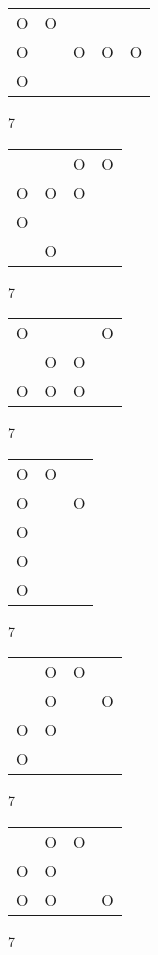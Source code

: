 \begin{tabular}{|m{0.2cm}m{0.2cm}m{0.2cm}m{0.2cm}m{0.2cm}|}\hline
O&O& & & \\
O& &O&O&O\\
O& & & & \\
\hline\end{tabular}7
\begin{tabular}{|m{0.2cm}m{0.2cm}m{0.2cm}m{0.2cm}|}\hline
 & &O&O\\
O&O&O& \\
O& & & \\
 &O& & \\
\hline\end{tabular}7
\begin{tabular}{|m{0.2cm}m{0.2cm}m{0.2cm}m{0.2cm}|}\hline
O& & &O\\
 &O&O& \\
O&O&O& \\
\hline\end{tabular}7
\begin{tabular}{|m{0.2cm}m{0.2cm}m{0.2cm}|}\hline
O&O& \\
O& &O\\
O& & \\
O& & \\
O& & \\
\hline\end{tabular}7
\begin{tabular}{|m{0.2cm}m{0.2cm}m{0.2cm}m{0.2cm}|}\hline
 &O&O& \\
 &O& &O\\
O&O& & \\
O& & & \\
\hline\end{tabular}7
\begin{tabular}{|m{0.2cm}m{0.2cm}m{0.2cm}m{0.2cm}|}\hline
 &O&O& \\
O&O& & \\
O&O& &O\\
\hline\end{tabular}7
